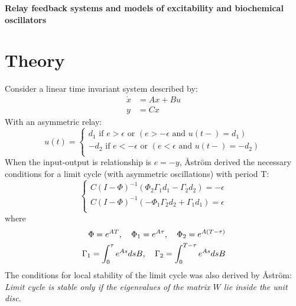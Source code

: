 \documentclass[a4paper]{article}
\begin{document}
\begin{center}

{\huge{{\textbf{Relay feedback systems and models of excitability and biochemical oscillators}}}}\vspace{0.1cm}
\end{center}

\section{Theory} 
Consider a linear time invariant system described by:
\begin{align}\dot{x} &= Ax + Bu  \\
y &= Cx\end{align}
With an asymmetric relay:
\begin{equation}
	u(t)=\begin{cases}
	               d_1 \text{ if } e > \epsilon \text{ or } (e >-\epsilon \text{ and } u(t-) = d_1)\\
	                -d_2 \text{ if } e < -\epsilon \text{ or } (e < \epsilon \text{ and } u(t-) = -d_2)\\
	              
	            \end{cases}
\end{equation}
When the input-output is relationship is $e = -y$,  \r{A}str\"{o}m\cite{astrom1995} derived the necessary conditions for a limit cycle (with asymmetric oscillations)  with period T:
\begin{equation}
\begin{cases}
	        C(I - \Phi)^{-1}(\Phi_2\Gamma_1d_1 - \Gamma_2d_2) = -\epsilon\\
	        C(I - \Phi)^{-1}(-\Phi_1\Gamma_2d_2 + \Gamma_1d_1) = \epsilon        \\
	              
	            \end{cases}
\end{equation}
where
\begin{align}\Phi = e^{AT} \text{,\hspace{0.3cm}  } \Phi_1 = e^{A\tau} \text{,\hspace{0.3cm}  } \Phi_2 = e^{A(T-\tau)} \\
\Gamma_1 = \int_{0}^{\tau}e^{As}dsB\text{,\hspace{0.3cm}  } \Gamma_2 = \int_{0}^{T-\tau}e^{As}dsB
\end{align}
The conditions for local stability of the limit cycle was also derived by \r{A}str\"{o}m\cite{astrom1995}:\\
\emph{Limit cycle is stable only if the eigenvalues of the matrix $W$ lie inside the unit disc.} 
\end{document}
